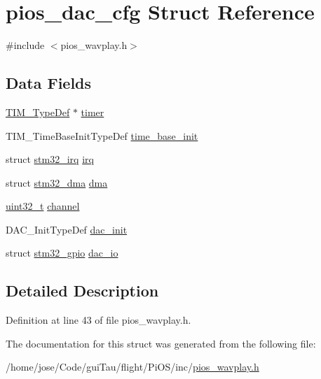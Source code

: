 \hypertarget{structpios__dac__cfg}{\section{pios\-\_\-dac\-\_\-cfg Struct Reference}
\label{structpios__dac__cfg}
}


{\ttfamily \#include $<$pios\-\_\-wavplay.\-h$>$}

\subsection*{Data Fields}
\begin{DoxyCompactItemize}
\item 
\hyperlink{struct_t_i_m___type_def}{T\-I\-M\-\_\-\-Type\-Def} $\ast$ \hyperlink{group___p_i_o_s___w_a_v_p_l_a_y_ga06b2a838489fd6bb8f48615002e024d8}{timer}
\item 
T\-I\-M\-\_\-\-Time\-Base\-Init\-Type\-Def \hyperlink{group___p_i_o_s___w_a_v_p_l_a_y_ga1568b0926bb1e178d06682a8495e0f40}{time\-\_\-base\-\_\-init}
\item 
struct \hyperlink{structstm32__irq}{stm32\-\_\-irq} \hyperlink{group___p_i_o_s___w_a_v_p_l_a_y_ga1db4430fc674d954d396ce5abf14307c}{irq}
\item 
struct \hyperlink{structstm32__dma}{stm32\-\_\-dma} \hyperlink{group___p_i_o_s___w_a_v_p_l_a_y_ga9794db8fe6627bb998ba905f5ec5b869}{dma}
\item 
\hyperlink{stdint_8h_a435d1572bf3f880d55459d9805097f62}{uint32\-\_\-t} \hyperlink{group___p_i_o_s___w_a_v_p_l_a_y_ga197e2e3664b092f223251af8db017392}{channel}
\item 
D\-A\-C\-\_\-\-Init\-Type\-Def \hyperlink{group___p_i_o_s___w_a_v_p_l_a_y_ga2da6286f80191750fd6960a67d4a1e20}{dac\-\_\-init}
\item 
struct \hyperlink{structstm32__gpio}{stm32\-\_\-gpio} \hyperlink{group___p_i_o_s___w_a_v_p_l_a_y_gae02d1c0fa0764b2cf3172a8d3582295f}{dac\-\_\-io}
\end{DoxyCompactItemize}


\subsection{Detailed Description}


Definition at line 43 of file pios\-\_\-wavplay.\-h.



The documentation for this struct was generated from the following file\-:\begin{DoxyCompactItemize}
\item 
/home/jose/\-Code/gui\-Tau/flight/\-Pi\-O\-S/inc/\hyperlink{pios__wavplay_8h}{pios\-\_\-wavplay.\-h}\end{DoxyCompactItemize}
